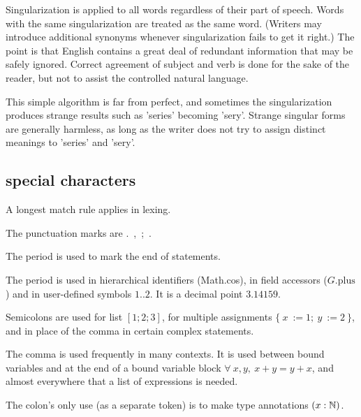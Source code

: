 \documentclass[12pt]{article}
\numberwithin{definition}{section}
\begin{document}
Singularization is applied to all words regardless of their part of
speech.  Words with the same singularization are treated as the same
word.  (Writers may introduce additional synonyms whenever
singularization fails to get it right.)  The point is that English
contains a great deal of redundant information that may be safely
ignored.  Correct agreement of subject and verb is done for the sake
of the reader, but not to assist the controlled natural language.

This simple algorithm is far from perfect, and sometimes the
singularization produces strange results such as 'series' becoming
'sery'.  Strange singular forms are generally harmless, as long as the
writer does not try to assign distinct meanings to 'series' and
'sery'.




\subsection{special characters}

A longest match rule applies in lexing.  

The punctuation marks are .\ ,\ ;\ .

The period is used to mark the end of statements.  

The period is used in hierarchical
identifiers (Math.cos), in field accessors ($G.\text{plus}$)
and in user-defined symbols $1..2$.  It is a decimal point $3.14159$.

Semicolons are used for list $[1;2;3]$, for multiple assignments 
$\{\ x\ := 1;\ y\ := 2\ \}$, and in place of the comma in certain complex statements.

The comma is used frequently in many contexts.  It is used between
bound variables and at the end of a bound variable block $\forall\ x,y,\ x + y = y + x$, 
and almost everywhere that a list of expressions is needed.



The colon's only use (as a separate token) is to make type annotations $(x : {\mathbb N})$.
\end{document}
